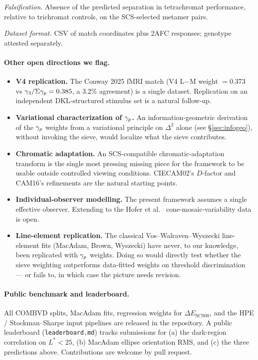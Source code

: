 \documentclass[12pt,a4paper]{article}
\begin{document}
\emph{Falsification.} Absence of the predicted separation in
tetrachromat performance, relative to trichromat controls, on the
SCS-selected metamer pairs.

\emph{Dataset format.} CSV of match coordinates plus 2AFC responses;
genotype attested separately.

\paragraph{Other open directions we flag.}
\begin{itemize}[nosep]
\item \textbf{V4 replication.} The Conway 2025 fMRI match (V4 L$-$M
  weight $= 0.373$ vs $\gamma_{3}/\Sigma \gamma_{p} = 0.385$, a $3.2\%$
  agreement) is a single dataset. Replication on an independent
  DKL-structured stimulus set is a natural follow-up.
\item \textbf{Variational characterization of $\gamma_{p}$.} An
  information-geometric derivation of the $\gamma_{p}$ weights from a
  variational principle on $\Delta^2$ alone (see
  \S\ref{sec:infogeo}), without invoking the sieve, would localize
  what the sieve contributes.
\item \textbf{Chromatic adaptation.} An SCS-compatible
  chromatic-adaptation transform is the single most pressing missing
  piece for the framework to be usable outside controlled viewing
  conditions. CIECAM02's $D$-factor and CAM16's refinements are the
  natural starting points.
\item \textbf{Individual-observer modelling.} The present framework
  assumes a single effective observer. Extending to the Hofer et al.\
  \cite{hofer2005} cone-mosaic-variability data is open.
\item \textbf{Line-element replication.} The classical
  Vos--Walraven--Wyszecki line-element fits (MacAdam, Brown, Wyszecki)
  have never, to our knowledge, been replicated with $\gamma_{p}$
  weights. Doing so would directly test whether the sieve weighting
  outperforms data-fitted weights on threshold discrimination --- or
  fails to, in which case the picture needs revision.
\end{itemize}

\paragraph{Public benchmark and leaderboard.}
All COMBVD splits, MacAdam fits, regression weights for
$\Delta E_{\mathrm{SCS00}}$, and the HPE / Stockman--Sharpe input
pipelines are released in the repository. A public leaderboard
(\texttt{leaderboard.md}) tracks submissions for (a) the dark-region
correlation on $L^* < 25$, (b) MacAdam ellipse orientation RMS, and
(c) the three predictions above. Contributions are welcome by pull
request.
\end{document}
